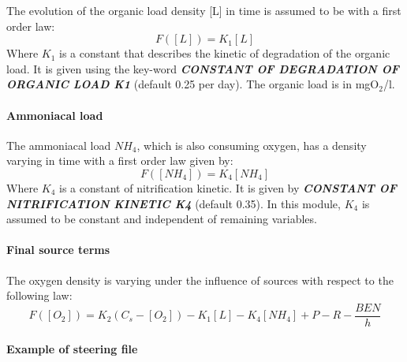  The evolution of the organic load density [L] in time is assumed to be with a first order law:
\begin{equation*}
 F([L]) = K_1 [L]
\end{equation*}
 Where $K_1$ is a constant that describes the kinetic of degradation of the organic load. It is given using the key-word \textbf{\textit{CONSTANT OF DEGRADATION OF ORGANIC LOAD K1}} (default 0.25 per day).  The organic load is in mgO$_2$/l.


\paragraph{ Ammoniacal load}

 The ammoniacal load $NH_4$, which is also consuming oxygen, has a density varying in time with a first order law given by:
\begin{equation*}
 F([NH{}_{4}]) = K_4 [NH{}_{4}]
\end{equation*}
 Where $K_4$ is a constant of nitrification kinetic. It is given by \textbf{\textit{CONSTANT OF NITRIFICATION KINETIC K4}}\textit{ }(default 0.35). In this module, $K_4$ is assumed to be constant and independent of remaining variables.


\paragraph{ Final source terms}

 The oxygen density is varying under the influence of sources with respect to the following law:
\begin{equation*}
F\left([O_2]\right)= K_2\left(C_s-[O_2]\right)-K_1\left[L\right]-K_4\left[NH_4\right]+P-R-\frac{BEN}{h}
\end{equation*}

\paragraph{ Example of steering file}

